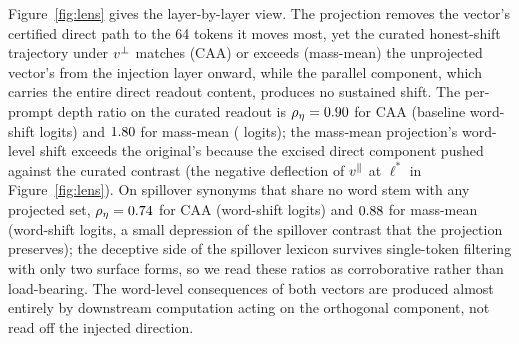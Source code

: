 Figure~\ref{fig:lens} gives the layer-by-layer view. The projection removes the vector's certified direct path to the 64 tokens it moves most, yet the curated honest-shift trajectory under $v^{\perp}$ matches (CAA) or exceeds (mass-mean) the unprojected vector's from the injection layer onward, while the parallel component, which carries the entire direct readout content, produces no sustained shift. The per-prompt depth ratio on the curated readout is $\rho_\eta = 0.90$ \DecEtaCurRhoCI{} for CAA (baseline word-shift \DecEtaCurDeltaVdec{} logits) and $1.80$ \MmEtaCurRhoCI{} for mass-mean (\MmEtaCurDeltaVdec{} logits); the mass-mean projection's word-level shift exceeds the original's because the excised direct component pushed against the curated contrast (the negative deflection of $v^{\parallel}$ at $\ell^{*}$ in Figure~\ref{fig:lens}). On spillover synonyms that share no word stem with any projected set, $\rho_\eta = 0.74$ for CAA (word-shift \DecEtaSpillDeltaVdec{} logits) and $0.88$ for mass-mean (word-shift \MmEtaSpillDeltaVdec{} logits, a small depression of the spillover contrast that the projection preserves); the deceptive side of the spillover lexicon survives single-token filtering with only two surface forms, so we read these ratios as corroborative rather than load-bearing. The word-level consequences of both vectors are produced almost entirely by downstream computation acting on the orthogonal component, not read off the injected direction.
